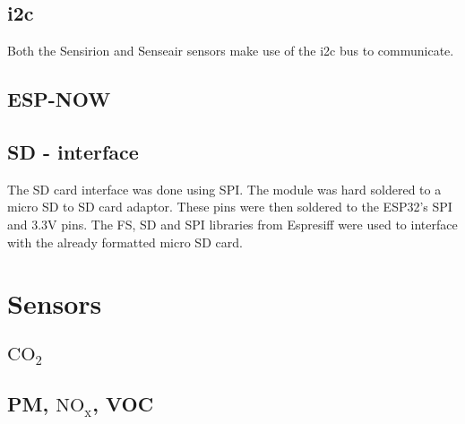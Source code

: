 \subsection{i2c}
Both the Sensirion and Senseair sensors make use of the i2c bus to communicate. 

\subsection{ESP-NOW}


\subsection{SD - interface}
The SD card interface was done using SPI. The module was hard soldered to a micro SD to SD card adaptor. These pins were then soldered to the ESP32's SPI and 3.3V pins.
The FS, SD and SPI libraries from Espresiff were used to interface with the already formatted micro SD card.




\section{Sensors}
\subsection{$\mathrm{CO_2}$}




\subsection{PM, $\mathrm{NO_x}$, VOC}

